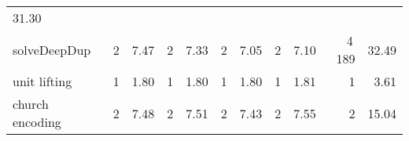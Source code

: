 \begin{tabular}{lrrrrrrrrrr}
 {\def\@currentlabel{31.30}\label{stats:RateDup:SharedFull:time}31.30} \\
\textsf{solveDeepDup}%
&
 {\def\@currentlabel{2}\label{stats:SolveDeepDup:Unshared:mem}2} &
 {\def\@currentlabel{7.47}\label{stats:SolveDeepDup:Unshared:time}7.47}&
 {\def\@currentlabel{2}\label{stats:SolveDeepDup:Shared:mem}2} &
 {\def\@currentlabel{7.33}\label{stats:SolveDeepDup:Shared:time}7.33}&
 {\def\@currentlabel{2}\label{stats:SolveDeepDup:SharedThunk:mem}2} &
 {\def\@currentlabel{7.05}\label{stats:SolveDeepDup:SharedThunk:time}7.05}&
 {\def\@currentlabel{2}\label{stats:SolveDeepDup:SharedEvaled:mem}2} &
 {\def\@currentlabel{7.10}\label{stats:SolveDeepDup:SharedEvaled:time}7.10}&
 {\def\@currentlabel{4\,189}\label{stats:SolveDeepDup:SharedFull:mem}4\,189} &
 {\def\@currentlabel{32.49}\label{stats:SolveDeepDup:SharedFull:time}32.49} \\
unit lifting%
&
 {\def\@currentlabel{1}\label{stats:Unit:Unshared:mem}1} &
 {\def\@currentlabel{1.80}\label{stats:Unit:Unshared:time}1.80}&
 {\def\@currentlabel{1}\label{stats:Unit:Shared:mem}1} &
 {\def\@currentlabel{1.80}\label{stats:Unit:Shared:time}1.80}&
 {\def\@currentlabel{1}\label{stats:Unit:SharedThunk:mem}1} &
 {\def\@currentlabel{1.80}\label{stats:Unit:SharedThunk:time}1.80}&
 {\def\@currentlabel{1}\label{stats:Unit:SharedEvaled:mem}1} &
 {\def\@currentlabel{1.81}\label{stats:Unit:SharedEvaled:time}1.81}&
 {\def\@currentlabel{1}\label{stats:Unit:SharedFull:mem}1} &
 {\def\@currentlabel{3.61}\label{stats:Unit:SharedFull:time}3.61} \\
church encoding%
&
 {\def\@currentlabel{2}\label{stats:Church:Unshared:mem}2} &
 {\def\@currentlabel{7.48}\label{stats:Church:Unshared:time}7.48}&
 {\def\@currentlabel{2}\label{stats:Church:Shared:mem}2} &
 {\def\@currentlabel{7.51}\label{stats:Church:Shared:time}7.51}&
 {\def\@currentlabel{2}\label{stats:Church:SharedThunk:mem}2} &
 {\def\@currentlabel{7.43}\label{stats:Church:SharedThunk:time}7.43}&
 {\def\@currentlabel{2}\label{stats:Church:SharedEvaled:mem}2} &
 {\def\@currentlabel{7.55}\label{stats:Church:SharedEvaled:time}7.55}&
 {\def\@currentlabel{2}\label{stats:Church:SharedFull:mem}2} &
 {\def\@currentlabel{15.04}\label{stats:Church:SharedFull:time}15.04} \\
\end{tabular}
\makeatother
